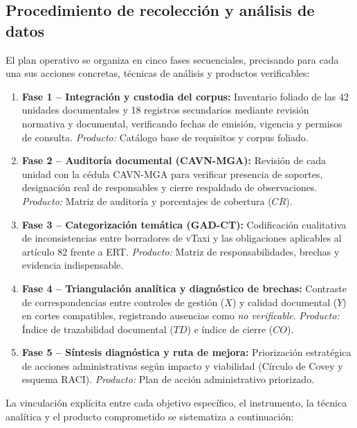 {\subsection{Procedimiento de recolección y análisis de datos}
El plan operativo se organiza en cinco fases secuenciales, precisando para cada una sus acciones concretas, técnicas de análisis y productos verificables:
\begin{enumerate}
    \item \textbf{Fase 1 -- Integración y custodia del corpus:} Inventario foliado de las 42 unidades documentales y 18 registros secundarios mediante revisión normativa y documental, verificando fechas de emisión, vigencia y permisos de consulta. \textit{Producto:} Catálogo base de requisitos y corpus foliado.
    \item \textbf{Fase 2 -- Auditoría documental (CAVN-MGA):} Revisión de cada unidad con la cédula CAVN-MGA para verificar presencia de soportes, designación real de responsables y cierre respaldado de observaciones. \textit{Producto:} Matriz de auditoría y porcentajes de cobertura ($CR$).
    \item \textbf{Fase 3 -- Categorización temática (GAD-CT):} Codificación cualitativa de inconsistencias entre borradores de vTaxi y las obligaciones aplicables al artículo 82 frente a ERT. \textit{Producto:} Matriz de responsabilidades, brechas y evidencia indispensable.
    \item \textbf{Fase 4 -- Triangulación analítica y diagnóstico de brechas:} Contraste de correspondencias entre controles de gestión ($X$) y calidad documental ($Y$) en cortes compatibles, registrando ausencias como \textit{no verificable}. \textit{Producto:} Índice de trazabilidad documental ($TD$) e índice de cierre ($CO$).
    \item \textbf{Fase 5 -- Síntesis diagnóstica y ruta de mejora:} Priorización estratégica de acciones administrativas según impacto y viabilidad (Círculo de Covey y esquema RACI). \textit{Producto:} Plan de acción administrativo priorizado.
\end{enumerate}

La vinculación explícita entre cada objetivo específico, el instrumento, la técnica analítica y el producto comprometido se sistematiza a continuación:

}
